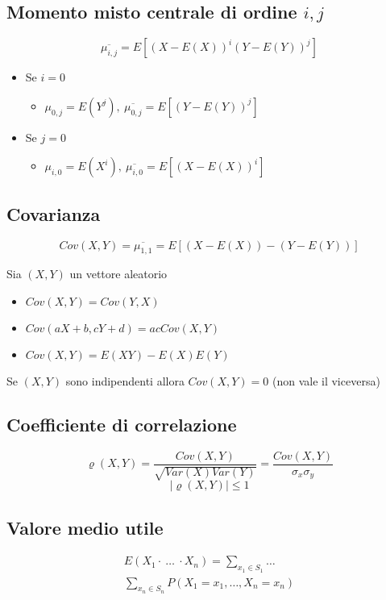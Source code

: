 \begin{multicols*}{2}
\subsection*{Momento misto centrale di ordine $i,j$}
$$
\overline{\mu_{i,j}} = E[(X- E(X))^i (Y - E(Y))^j]
$$
\begin{itemize}
    \item Se $i = 0$
    \begin{itemize}
        \item $\mu_{0,j} = E(Y^j), \ \overline{\mu_{0,j}} = E[(Y - E(Y))^j]$
    \end{itemize}
    \item Se $j = 0$
    \begin{itemize}
        \item $\mu_{i,0} = E(X^i), \ \overline{\mu_{i,0}} = E[(X - E(X))^i]$
    \end{itemize}
\end{itemize}

\subsection*{Covarianza}
$$
\mathit{Cov}(X,Y) = \overline{\mu_{1,1}} = E[(X - E(X)) - (Y - E(Y))]
$$
 
Sia $(X,Y)$ un vettore aleatorio
\begin{itemize}
    \item $\mathit{Cov}(X,Y) = \mathit{Cov}(Y,X)$
    \item $\mathit{Cov}(aX + b, cY + d) = ac \mathit{Cov}(X,Y)$
    \item $\mathit{Cov}(X,Y) = E(XY) - E(X)E(Y)$
\end{itemize}

Se $(X,Y)$ sono indipendenti allora $\mathit{Cov}(X,Y) = 0$ (non vale il viceversa)

\subsection*{Coefficiente di correlazione}
$$
\varrho(X,Y) = \frac{\mathit{Cov}(X,Y)}{\sqrt{\mathit{Var}(X) \mathit{Var}(Y)}}
= \frac{\mathit{Cov}(X,Y)}{\sigma_x \sigma_y}
$$
$$
|\varrho(X,Y)| \le 1
$$

\subsection*{Valore medio utile}
\begin{align*}
E(X_1 \cdot \ \dots \ \cdot X_n) = \sum_{x_1 \in S_1} \dots 
\\\sum_{x_n \in S_n}
P(X_1=x_1, \dots, X_n=x_n)
\end{align*}

\end{multicols*}